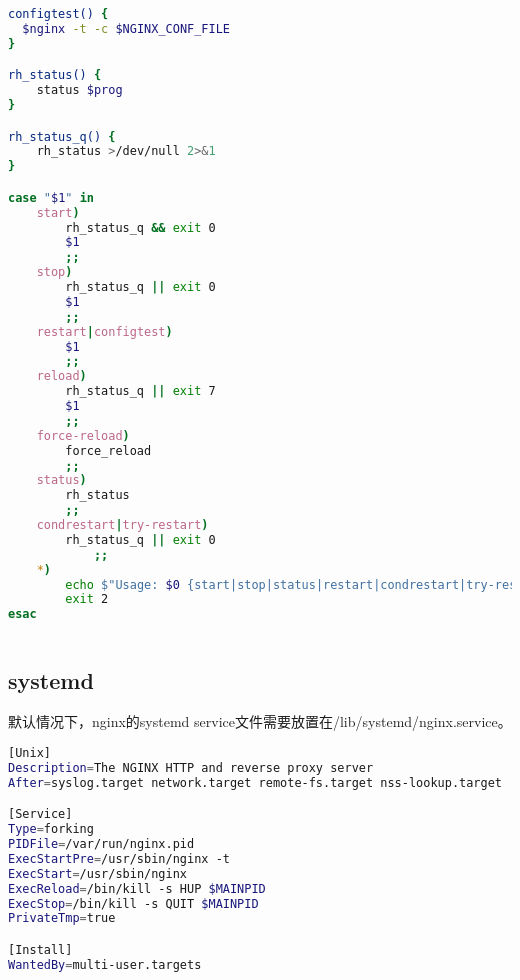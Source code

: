 \begin{lstlisting}[language=bash]
configtest() {
  $nginx -t -c $NGINX_CONF_FILE
}

rh_status() {
    status $prog
}

rh_status_q() {
    rh_status >/dev/null 2>&1
}

case "$1" in
    start)
        rh_status_q && exit 0
        $1
        ;;
    stop)
        rh_status_q || exit 0
        $1
        ;;
    restart|configtest)
        $1
        ;;
    reload)
        rh_status_q || exit 7
        $1
        ;;
    force-reload)
        force_reload
        ;;
    status)
        rh_status
        ;;
    condrestart|try-restart)
        rh_status_q || exit 0
            ;;
    *)
        echo $"Usage: $0 {start|stop|status|restart|condrestart|try-restart|reload|force-reload|configtest}"
        exit 2
esac
\end{lstlisting}



\begin{lstlisting}[language=bash]

\end{lstlisting}




\subsection{systemd}


默认情况下，nginx的systemd service文件需要放置在/lib/systemd/nginx.service。



\begin{lstlisting}[language=bash]
[Unix]
Description=The NGINX HTTP and reverse proxy server
After=syslog.target network.target remote-fs.target nss-lookup.target

[Service]
Type=forking
PIDFile=/var/run/nginx.pid
ExecStartPre=/usr/sbin/nginx -t
ExecStart=/usr/sbin/nginx
ExecReload=/bin/kill -s HUP $MAINPID
ExecStop=/bin/kill -s QUIT $MAINPID
PrivateTmp=true

[Install]
WantedBy=multi-user.targets
\end{lstlisting}















\begin{lstlisting}[language=bash]

\end{lstlisting}




